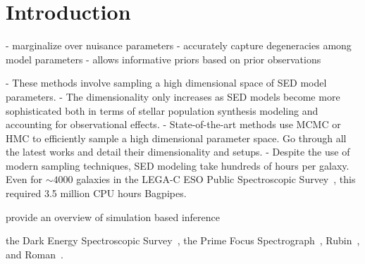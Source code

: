 \section{Introduction} \label{sec:intro} 


- marginalize over nuisance parameters
- accurately capture degeneracies among model parameters
- allows informative priors based on prior observations

- These methods involve sampling a high dimensional space of SED model
parameters. 
- The dimensionality only increases as SED models become more sophisticated
both in terms of stellar population synthesis modeling and accounting for
observational effects.  
- State-of-the-art methods use MCMC or HMC to efficiently sample a high
dimensional parameter space. Go through all the latest works and detail their
dimensionality and setups. 
- Despite the use of modern sampling techniques, SED modeling take hundreds of
hours per galaxy. Even for $\sim 4000$ galaxies in the LEGA-C ESO Public
Spectroscopic Survey~\cite{}, this required 3.5 million CPU hours {\sc
Bagpipes}. 

provide an overview of simulation based inference 

the Dark Energy Spectroscopic
Survey~\citep[DESI;][]{desicollaboration2016}, the Prime Focus
Spectrograph~\citep[PFS;][]{takada2014}, Rubin~, and
Roman~.


